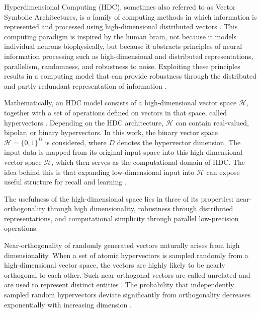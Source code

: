     Hyperdimensional Computing (HDC), sometimes also referred to as Vector Symbolic Architectures, is a family of computing methods in which information is represented and processed using high-dimensional distributed vectors \cite{thomas_theoretical_2021}. This computing paradigm is inspired by the human brain, not because it models individual neurons biophysically, but because it abstracts principles of neural information processing such as high-dimensional and distributed representations, parallelism, randomness, and robustness to noise. Exploiting these principles results in a computing model that can provide robustness through the distributed and partly redundant representation of information \cite{kanerva_hyperdimensional_2009}.
    
    Mathematically, an HDC model consists of a high-dimensional vector space $\mathcal{H}$, together with a set of operations defined on vectors in that space, called hypervectors \cite{schlegel_comparison_2022}. Depending on the HDC architecture, $\mathcal{H}$ can contain real-valued, bipolar, or binary hypervectors. In this work, the binary vector space $\mathcal{H}=\{0,1\}^D$ is considered, where $D$ denotes the hypervector dimension. The input data is mapped from its original input space into this high-dimensional vector space $\mathcal{H}$, which then serves as the computational domain of HDC. The idea behind this is that expanding low-dimensional input into $\mathcal{H}$ can expose useful structure for recall and learning \cite{thomas_theoretical_2021}.
    
    The usefulness of the high-dimensional space lies in three of its properties: near-orthogonality through high dimensionality, robustness through distributed representations, and computational simplicity through parallel low-precision operations.
    
    Near-orthogonality of randomly generated vectors naturally arises from high dimensionality. When a set of atomic hypervectors is sampled randomly from a high-dimensional vector space, the vectors are highly likely to be nearly orthogonal to each other. Such near-orthogonal vectors are called unrelated and are used to represent distinct entities \cite{kanerva_hyperdimensional_2009}. The probability that independently sampled random hypervectors deviate significantly from orthogonality decreases exponentially with increasing dimension \cite{hoeffding_probability_1963,thomas_theoretical_2021}.
    
